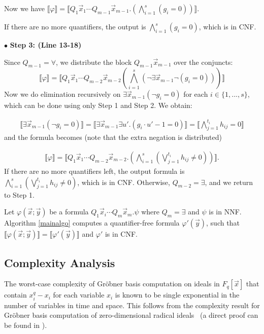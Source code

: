 \documentclass[envcountsect]{llncs}
\begin{document}
Now we have $\llbracket \varphi \rrbracket = \llbracket Q_1\vec x_1\cdots Q_{m-1}\vec x_{m-1}.(\bigwedge_{i=1}^{s} (g_i=0) ) \rrbracket.$

If there are no more quantifiers, the output is $\bigwedge_{i=1}^{s} (g_i=0)$, which is in CNF.


$\bullet$ {\bf Step 3: (Line 13-18)} 

Since $Q_{m-1}=\forall$, we distribute the block $Q_{m-1}\vec x_{m-1}$ over the conjuncts:
{$$\llbracket \varphi\rrbracket = \llbracket Q_1\vec x_1\cdots Q_{m-2}\vec x_{m-2} (\bigwedge_{i=1}^{s} (\neg\exists\vec x_{m-1}\neg (g_i=0)) )\rrbracket 
$$}Now we do elimination recursively on $\exists \vec x_{m-1}(\neg g_i=0)$ for each $i\in \{1,...,s\}$, which can be done using only Step 1 and Step 2. We obtain:{
\begin{eqnarray}\label{secondform}
\llbracket \exists  \vec x_{m-1} (\neg g_i=0)\rrbracket = \llbracket \exists \vec x_{m-1}\exists u'. (g_i\cdot u' -1 = 0)\rrbracket = \llbracket \bigwedge_{j=1}^{t_i} h_{ij}=0 \rrbracket
\end{eqnarray}
and the formula becomes (note that the extra negation is distributed){
\begin{eqnarray}\label{firstform}
\llbracket \varphi \rrbracket = \llbracket Q_1\vec x_1\cdots Q_{m-2}\vec x_{m-2}.(\bigwedge_{i=1}^{s} (\bigvee_{j=1}^{t_i} h_{ij}\neq 0))\rrbracket.
\end{eqnarray}
If there are no more quantifiers left, the output formula is $\bigwedge_{i=1}^{s} (\bigvee_{j=1}^{t_i} h_{ij}\neq 0)$, which is in CNF. Otherwise, $Q_{m-2} = \exists$, and we return to Step 1.



\begin{theorem}[Correctness]
Let $\varphi(\vec x; \vec y)$ be a formula $Q_1\vec x_i\cdots Q_m \vec x_m.\psi$ where $Q_m=\exists$ and $\psi$ is in NNF. Algorithm \ref{mainalgo} computes a quantifier-free formula $\varphi'(\vec y)$, such that $\llbracket \varphi(\vec x; \vec y)\rrbracket = \llbracket \varphi'(\vec y) \rrbracket$ and $\varphi'$ is in CNF.
\end{theorem}

\subsection{Complexity Analysis}

The worst-case complexity of Gr\"obner basis computation on ideals in $F_q[\vec x]$ that contain $x_i^q-x_i$ for each variable $x_i$ is known to be single exponential in the number of variables in time and space. This follows from the complexity result for Gr\"obner basis computation of zero-dimensional radical ideals~\cite{Lakshman} (a direct proof can be found in \cite{gao09}). 

}}
\end{document}
